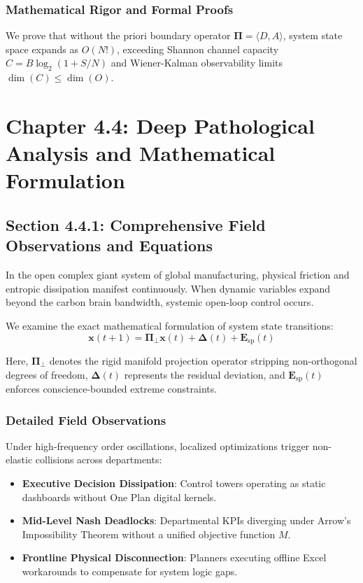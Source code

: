 \documentclass[12pt,a4paper,oneside]{book}
\begin{document}
\subsection*{Mathematical Rigor and Formal Proofs}
We prove that without the priori boundary operator $\mathbf{\Pi} = \langle D, A \rangle$, system state space expands as $O(N!)$, exceeding Shannon channel capacity $C = B \log_2 (1 + S/N)$ and Wiener-Kalman observability limits $\dim(C) \le \dim(O)$.
\clearpage
\chapter{Chapter 4.4: Deep Pathological Analysis and Mathematical Formulation}
\section{Section 4.4.1: Comprehensive Field Observations and Equations}

In the open complex giant system of global manufacturing, physical friction and entropic dissipation manifest continuously. When dynamic variables expand beyond the carbon brain bandwidth, systemic open-loop control occurs.

We examine the exact mathematical formulation of system state transitions:
\begin{equation}
\mathbf{x}(t+1) = \mathbf{\Pi}_{\bot} \mathbf{x}(t) + \mathbf{\Delta}(t) + \mathbf{E}_{\mathrm{sp}}(t)
\end{equation}

Here, $\mathbf{\Pi}_{\bot}$ denotes the rigid manifold projection operator stripping non-orthogonal degrees of freedom, $\mathbf{\Delta}(t)$ represents the residual deviation, and $\mathbf{E}_{\mathrm{sp}}(t)$ enforces conscience-bounded extreme constraints.

\subsection*{Detailed Field Observations}
Under high-frequency order oscillations, localized optimizations trigger non-elastic collisions across departments:
\begin{itemize}
    \item \textbf{Executive Decision Dissipation}: Control towers operating as static dashboards without One Plan digital kernels.
    \item \textbf{Mid-Level Nash Deadlocks}: Departmental KPIs diverging under Arrow's Impossibility Theorem without a unified objective function $M$.
    \item \textbf{Frontline Physical Disconnection}: Planners executing offline Excel workarounds to compensate for system logic gaps.
\end{itemize}
\end{document}
